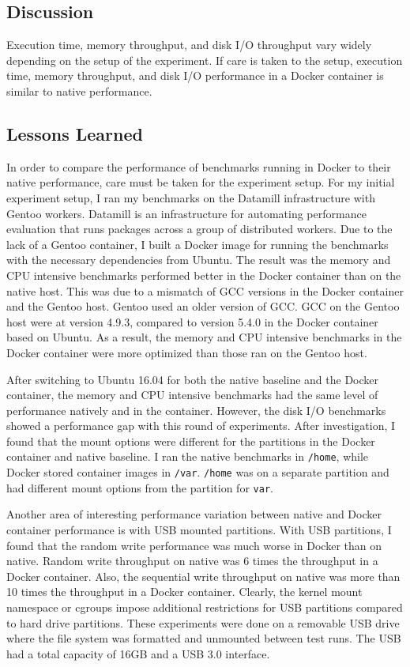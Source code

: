 \documentclass[11pt]{article}
\begin{document}
\begin{itemize}
\section{Discussion}
Execution time, memory throughput, and disk I/O throughput vary widely depending on the setup of the experiment. If care is taken to the setup, execution time, memory throughput, and disk I/O performance in a Docker container is similar to native performance.  


\subsection{Lessons Learned}
In order to compare the performance of benchmarks running in Docker to their native performance, care must be taken for the experiment setup. For my initial experiment setup, I ran my benchmarks on the Datamill infrastructure with Gentoo workers. Datamill is an infrastructure for automating performance evaluation that runs packages across a group of distributed workers. Due to the lack of a Gentoo container, I built a Docker image for running the benchmarks with the necessary dependencies from Ubuntu. The result was the memory and CPU intensive benchmarks performed better in the Docker container than on the native host. This was due to a mismatch of GCC versions in the Docker container and the Gentoo host. Gentoo used an older version of GCC. GCC on the Gentoo host were at version 4.9.3, compared to version 5.4.0 in the Docker container based on Ubuntu. As a result, the memory and CPU intensive benchmarks in the Docker container were more optimized than those ran on the Gentoo host. 

After switching to Ubuntu 16.04 for both the native baseline and the Docker container, the memory and  CPU intensive benchmarks had the same level of performance natively and in the container. However, the disk I/O benchmarks showed a performance gap with this round of experiments. After investigation, I found that the mount options were different for the partitions in the Docker container and native baseline. I ran the native benchmarks in \texttt{/home}, while Docker stored container images in \texttt{/var}. \texttt{/home} was on a separate partition and had different mount options from the partition for \texttt{var}. 

Another area of interesting performance variation between native and Docker container performance is with USB mounted partitions. With USB partitions, I found that the random write performance was much worse in Docker than on native. Random write throughput on native was 6 times the throughput in a Docker container. Also, the sequential write throughput on native was more than 10 times the throughput in a Docker container. Clearly, the kernel mount namespace or cgroups impose additional restrictions for USB partitions compared to hard drive partitions. These experiments were done on a removable USB drive where the file system was formatted and unmounted between test runs. The USB had a total capacity of 16GB and a USB 3.0 interface. 


\end{itemize}
\end{document}
